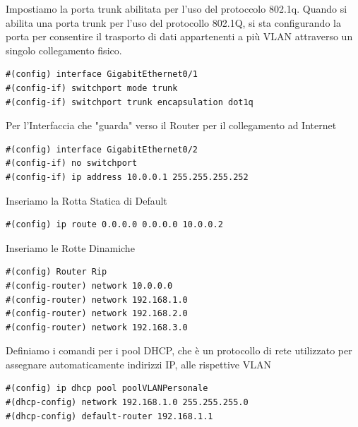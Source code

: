 \documentclass[12pt]{article}
\begin{document}
\begin{center}
            \newpage
            Impostiamo la porta trunk abilitata per l'uso del protoccolo 802.1q. Quando si abilita una porta trunk per l'uso del protocollo 802.1Q, si sta configurando la porta per consentire il trasporto di dati appartenenti a più VLAN attraverso un singolo collegamento fisico. 
            \begin{tcolorbox}[title=Multilayer Switch, colframe=gray!50!gray, colback=white!50!white]
                \begin{lstlisting}
#(config) interface GigabitEthernet0/1
#(config-if) switchport mode trunk
#(config-if) switchport trunk encapsulation dot1q
                \end{lstlisting} 
            \end{tcolorbox}
            Per l'Interfaccia che "guarda" verso il Router per il collegamento ad Internet
            \begin{tcolorbox}[title=Multilayer Switch, colframe=gray!50!gray, colback=white!50!white]
                \begin{lstlisting}
#(config) interface GigabitEthernet0/2
#(config-if) no switchport
#(config-if) ip address 10.0.0.1 255.255.255.252
                \end{lstlisting} 
            \end{tcolorbox}
            Inseriamo la Rotta Statica di Default
            \begin{tcolorbox}[title=Multilayer Switch, colframe=gray!50!gray, colback=white!50!white]
                \begin{lstlisting}
#(config) ip route 0.0.0.0 0.0.0.0 10.0.0.2
                \end{lstlisting} 
            \end{tcolorbox}
            Inseriamo le Rotte Dinamiche 
            \begin{tcolorbox}[title=Multilayer Switch, colframe=gray!50!gray, colback=white!50!white]
                \begin{lstlisting}
#(config) Router Rip
#(config-router) network 10.0.0.0
#(config-router) network 192.168.1.0
#(config-router) network 192.168.2.0
#(config-router) network 192.168.3.0
                \end{lstlisting} 
            \end{tcolorbox}

            \newpage
            Definiamo i comandi per i pool DHCP, che è un protocollo di rete utilizzato per assegnare automaticamente indirizzi IP, 
                alle rispettive VLAN
            \begin{tcolorbox}[title=Multilayer Switch, colframe=gray!50!gray, colback=white!50!white]
                \begin{lstlisting}
#(config) ip dhcp pool poolVLANPersonale
#(dhcp-config) network 192.168.1.0 255.255.255.0
#(dhcp-config) default-router 192.168.1.1


\end{lstlisting}
\end{tcolorbox}
\end{center}
\end{document}
